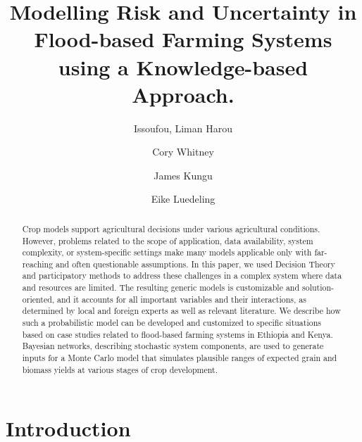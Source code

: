 \documentclass[]{elsarticle} %
\begin{document}
\begin{frontmatter}

  \title{Modelling Risk and Uncertainty in Flood-based Farming Systems using a Knowledge-based Approach.}
    \author[KU,ICRAF]{Issoufou, Liman Harou}
    \author[INRES]{Cory Whitney}
    \author[KU]{James Kungu}
    \author[INRES]{Eike Luedeling}
      \address[KU]{Kenyatta University, Department of Environmental Sciences, P.O. Box 43844 00100 Nairobi, Kenya}
    \address[ICRAF]{World Agroforestry Centre (ICRAF), United Nations Avenue, Gigiri, P.O. Box 30677-00100, Nairobi, Kenya}
    \address[INRES]{University of Bonn, Department of Horticultural Sciences, Auf dem Hügel 6, D-53121, Bonn, Germany}
    \address[ZEF]{Center for Development research (ZEF), University of Bonn, Genscherallee 3, D-53113, Bonn, Germany}
    
  \begin{abstract}
  Crop models support agricultural decisions under various agricultural conditions. However, problems related to the scope of application, data availability, system complexity, or system-specific settings make many models applicable only with far-reaching and often questionable assumptions. In this paper, we used Decision Theory and participatory methods to address these challenges in a complex system where data and resources are limited. The resulting generic models is customizable and solution-oriented, and it accounts for all important variables and their interactions, as determined by local and foreign experts as well as relevant literature. We describe how such a probabilistic model can be developed and customized to specific situations based on case studies related to flood-based farming systems in Ethiopia and Kenya. Bayesian networks, describing stochastic system components, are used to generate inputs for a Monte Carlo model that simulates plausible ranges of expected grain and biomass yields at various stages of crop development.
  \end{abstract}
  
 \end{frontmatter}

\hypertarget{introduction}{%
\section*{Introduction}\label{introduction}}
\end{document}

